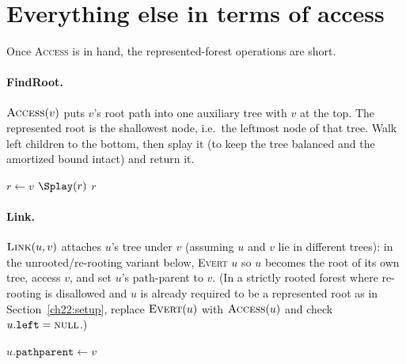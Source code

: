 \section{Everything else in terms of access}
\label{ch22:derived}

Once \textsc{Access} is in hand, the represented-forest operations are short.

\paragraph{FindRoot.}
$\textsc{Access}(v)$ puts $v$'s root path into one auxiliary tree with $v$ at the
top. The represented root is the shallowest node, i.e.\ the leftmost node of that
tree. Walk left children to the bottom, then splay it (to keep the tree balanced
and the amortized bound intact) and return it.

\begin{algorithm}[H]
\caption{$\textsc{FindRoot}(v)$}
\label{ch22:alg-findroot}
\DontPrintSemicolon
{}
\;
$r \leftarrow v$\;
$\Splay(r)$\;
\Return $r$\;
\end{algorithm}

\paragraph{Link.}
$\textsc{Link}(u,v)$ attaches $u$'s tree under $v$ (assuming $u$ and $v$ lie in
different trees): in the unrooted/re-rooting variant below, \textsc{Evert} $u$ so
$u$ becomes the root of its own tree, access $v$, and set $u$'s path-parent to $v$.
(In a strictly rooted forest where re-rooting is disallowed and $u$ is already
required to be a represented root as in Section~\ref{ch22:setup}, replace
$\textsc{Evert}(u)$ with $\textsc{Access}(u)$ and check $u.\texttt{left}=\textsc{null}$.)

\begin{algorithm}[H]
\caption{$\textsc{Link}(u,v)$ -- attach $u$ under $v$ (re-rooting variant)}
\label{ch22:alg-link}
\DontPrintSemicolon
{}
 
\;
$u.\texttt{pathparent} \leftarrow v$ 
\end{algorithm}

